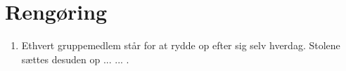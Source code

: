 \section{Rengøring}
\begin{enumerate}
\item{Ethvert gruppemedlem står for at rydde op efter sig selv hverdag. Stolene sættes desuden op
... ... .}
\end{enumerate}
